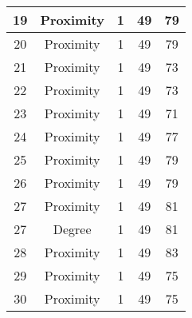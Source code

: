 \documentclass[results.tex]{subfiles}
\begin{document}
\begin{center}
\begin{tabular}{| c || c | c | c | c |}
            \hline
            19                      & Proximity                    & 1                      & 49                      & 79                   \\
            \hline
            20                      & Proximity                    & 1                      & 49                      & 79                   \\
            \hline
            21                      & Proximity                    & 1                      & 49                      & 73                   \\
            \hline
            22                      & Proximity                    & 1                      & 49                      & 73                   \\
            \hline
            23                      & Proximity                    & 1                      & 49                      & 71                   \\
            \hline
            24                      & Proximity                    & 1                      & 49                      & 77                   \\
            \hline
            25                      & Proximity                    & 1                      & 49                      & 79                   \\
            \hline
            26                      & Proximity                    & 1                      & 49                      & 79                   \\
            \hline
            27                      & Proximity                    & 1                      & 49                      & 81                   \\
            \hline
            27                      & Degree                       & 1                      & 49                      & 81                   \\
            \hline
            28                      & Proximity                    & 1                      & 49                      & 83                   \\
            \hline
            29                      & Proximity                    & 1                      & 49                      & 75                   \\
            \hline
            30                      & Proximity                    & 1                      & 49                      & 75                   \\

\end{tabular}
\end{center}
\end{document}
